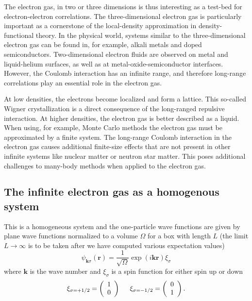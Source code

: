 \documentclass[%
oneside,                 %
final,                   %
10pt]{article}
\begin{document}
The electron gas, in 
two or three dimensions is thus interesting as a test-bed for 
electron-electron correlations. The three-dimensional 
electron gas is particularly important as a cornerstone 
of the local-density approximation in density-functional 
theory. In the physical world, systems 
similar to the three-dimensional electron gas can be 
found in, for example, alkali metals and doped 
semiconductors. Two-dimensional electron fluids are 
observed on metal and liquid-helium surfaces, as well as 
at metal-oxide-semiconductor interfaces. However, the Coulomb 
interaction has an infinite range, and therefore 
long-range correlations play an essential role in the
electron gas. 




At low densities, the electrons become 
localized and form a lattice. This so-called Wigner 
crystallization is a direct consequence 
of the long-ranged repulsive interaction. At higher
densities, the electron gas is better described as a
liquid.
When using, for example, Monte Carlo methods the electron gas must be approximated 
by a finite system. The long-range Coulomb interaction 
in the electron gas causes additional finite-size effects  that are not
present in other infinite systems like nuclear matter or neutron star matter.
This poses additional challenges to many-body methods when applied 
to the electron gas.





\subsection{The infinite electron gas as a homogenous system}

This is a homogeneous system and the one-particle wave functions are given by plane wave functions normalized to a volume $\Omega$ 
for a box with length $L$ (the limit $L\rightarrow \infty$ is to be taken after we have computed various expectation values)
\[
\psi_{\mathbf{k}\sigma}(\mathbf{r})= \frac{1}{\sqrt{\Omega}}\exp{(i\mathbf{kr})}\xi_{\sigma}
\]
where $\mathbf{k}$ is the wave number and  $\xi_{\sigma}$ is a spin function for either spin up or down
\[ 
\xi_{\sigma=+1/2}=\left(\begin{array}{c} 1 \\ 0 \end{array}\right) \hspace{0.5cm}
\xi_{\sigma=-1/2}=\left(\begin{array}{c} 0 \\ 1 \end{array}\right).
\]
\end{document}
